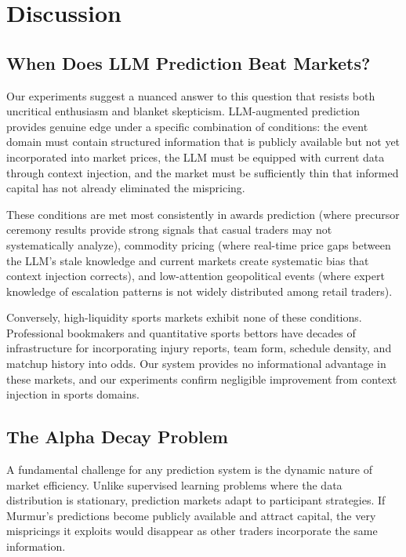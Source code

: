 \section{Discussion}
\label{sec:discuss}

\subsection{When Does LLM Prediction Beat Markets?}

Our experiments suggest a nuanced answer to this question that resists both uncritical enthusiasm and blanket skepticism. LLM-augmented prediction provides genuine edge under a specific combination of conditions: the event domain must contain structured information that is publicly available but not yet incorporated into market prices, the LLM must be equipped with current data through context injection, and the market must be sufficiently thin that informed capital has not already eliminated the mispricing.

These conditions are met most consistently in awards prediction (where precursor ceremony results provide strong signals that casual traders may not systematically analyze), commodity pricing (where real-time price gaps between the LLM's stale knowledge and current markets create systematic bias that context injection corrects), and low-attention geopolitical events (where expert knowledge of escalation patterns is not widely distributed among retail traders).

Conversely, high-liquidity sports markets exhibit none of these conditions. Professional bookmakers and quantitative sports bettors have decades of infrastructure for incorporating injury reports, team form, schedule density, and matchup history into odds. Our system provides no informational advantage in these markets, and our experiments confirm negligible improvement from context injection in sports domains.

\subsection{The Alpha Decay Problem}

A fundamental challenge for any prediction system is the dynamic nature of market efficiency. Unlike supervised learning problems where the data distribution is stationary, prediction markets adapt to participant strategies. If Murmur's predictions become publicly available and attract capital, the very mispricings it exploits would disappear as other traders incorporate the same information.

